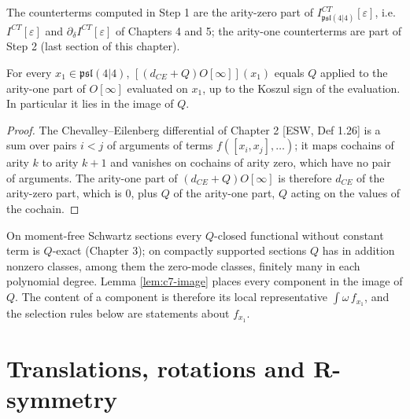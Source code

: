 The counterterms computed in Step 1 are the arity-zero part of $I^{CT}_{\mathfrak{psl}(4|4)}[\varepsilon]$, i.e. $I^{CT}[\varepsilon]$ and $\partial_\delta I^{CT}[\varepsilon]$ of Chapters 4 and 5; the arity-one counterterms are part of Step 2 (last section of this chapter).

\begin{lemma}
\label{lem:c7-image}
For every $x_1\in\mathfrak{psl}(4|4)$, $[(d_{CE}+Q)O[\infty]](x_1)$ equals $Q$ applied to the arity-one part of $O[\infty]$ evaluated on $x_1$, up to the Koszul sign of the evaluation. In particular it lies in the image of $Q$.
\end{lemma}

\begin{proof}
The Chevalley--Eilenberg differential of Chapter 2 [ESW, Def 1.26] is a sum over pairs $i<j$ of arguments of terms $f([x_i,x_j],\dots)$; it maps cochains of arity $k$ to arity $k+1$ and vanishes on cochains of arity zero, which have no pair of arguments. The arity-one part of $(d_{CE}+Q)O[\infty]$ is therefore $d_{CE}$ of the arity-zero part, which is $0$, plus $Q$ of the arity-one part, $Q$ acting on the values of the cochain.
\end{proof}

\begin{remark}
\label{rem:c7-content}
On moment-free Schwartz sections every $Q$-closed functional without constant term is $Q$-exact (Chapter 3); on compactly supported sections $Q$ has in addition nonzero classes, among them the zero-mode classes, finitely many in each polynomial degree. Lemma \ref{lem:c7-image} places every component in the image of $Q$. The content of a component is therefore its local representative $\int\omega\,f_{x_1}$, and the selection rules below are statements about $f_{x_1}$.
\end{remark}

\section{Translations, rotations and R-symmetry}

